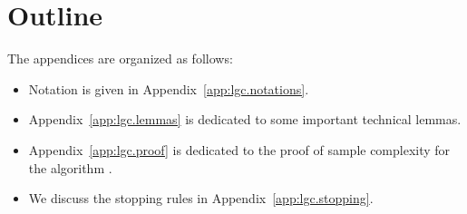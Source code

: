\section{Outline}\label{app:lgc.outline}

The appendices are organized as follows:
\begin{itemize}[label=$\square$]
    \item Notation is given in Appendix~\ref{app:lgc.notations}. 
    \item Appendix~\ref{app:lgc.lemmas} is dedicated to some important technical lemmas.
    \item Appendix~\ref{app:lgc.proof} is dedicated to the proof of sample complexity for the algorithm \LG{}.
    \item We discuss the stopping rules in Appendix~\ref{app:lgc.stopping}.
\end{itemize}

